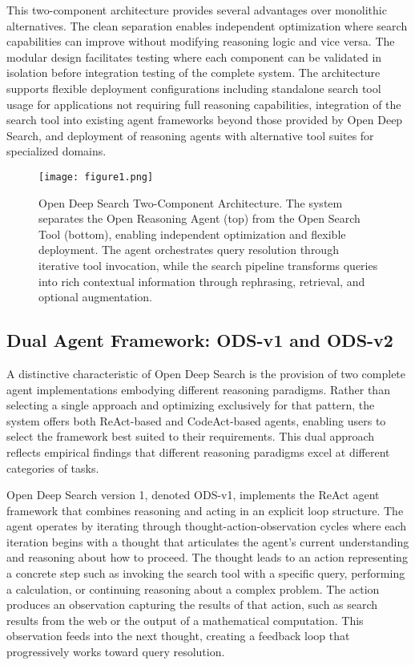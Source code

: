 This two-component architecture provides several advantages over monolithic alternatives. The clean separation enables independent optimization where search capabilities can improve without modifying reasoning logic and vice versa. The modular design facilitates testing where each component can be validated in isolation before integration testing of the complete system. The architecture supports flexible deployment configurations including standalone search tool usage for applications not requiring full reasoning capabilities, integration of the search tool into existing agent frameworks beyond those provided by Open Deep Search, and deployment of reasoning agents with alternative tool suites for specialized domains.

\begin{figure}[htbp]
    \centering
    \texttt{[image: figure1.png]}
    \caption{Open Deep Search Two-Component Architecture. The system separates the Open Reasoning Agent (top) from the Open Search Tool (bottom), enabling independent optimization and flexible deployment. The agent orchestrates query resolution through iterative tool invocation, while the search pipeline transforms queries into rich contextual information through rephrasing, retrieval, and optional augmentation.}
    \label{fig:open_deep_search_architecture}
\end{figure}


\subsection{Dual Agent Framework: ODS-v1 and ODS-v2}

A distinctive characteristic of Open Deep Search is the provision of two complete agent implementations embodying different reasoning paradigms. Rather than selecting a single approach and optimizing exclusively for that pattern, the system offers both ReAct-based and CodeAct-based agents, enabling users to select the framework best suited to their requirements. This dual approach reflects empirical findings that different reasoning paradigms excel at different categories of tasks.

Open Deep Search version 1, denoted ODS-v1, implements the ReAct agent framework that combines reasoning and acting in an explicit loop structure. The agent operates by iterating through thought-action-observation cycles where each iteration begins with a thought that articulates the agent's current understanding and reasoning about how to proceed. The thought leads to an action representing a concrete step such as invoking the search tool with a specific query, performing a calculation, or continuing reasoning about a complex problem. The action produces an observation capturing the results of that action, such as search results from the web or the output of a mathematical computation. This observation feeds into the next thought, creating a feedback loop that progressively works toward query resolution.

